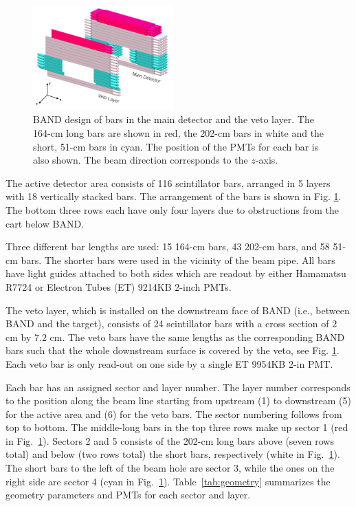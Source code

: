 \documentclass[3p,final,twocolumn]{elsarticle}
\begin{document}
\begin{figure}[tb]
	\centering
			\includegraphics[width=0.48\textwidth]{band-schematic.pdf}
            \caption{BAND design of bars in the main
                   detector and the veto layer. The 164-\si{\centi\meter} long bars are shown in
                          red, the 202-\si{\centi\meter} bars in white
                          and the short, 51-\si{\centi\meter} bars in cyan. The position of
                          the PMTs for each bar is also shown. The beam direction corresponds to the $z$-axis.   }
		\label{fig:design}
\end{figure}

The active detector area consists of 116 scintillator bars, arranged
in 5 layers with 18 vertically stacked bars. The arrangement of the
bars is shown in Fig. \ref{fig:design}. The bottom three rows each have only
four layers due to obstructions from the cart below BAND.

Three different bar lengths are used: 15 164-\si{\centi\meter} bars, 43 202-\si{\centi\meter} bars, and 58 
51-\si{\centi\meter}  bars. The shorter bars were used in the vicinity of
the beam pipe. All bars have light guides attached to both sides which
are readout by either Hamamatsu R7724 \cite{pmtR7724} or Electron
Tubes (ET) 9214KB \cite{pmt9214} 2-inch PMTs.

The veto layer, which is installed on the downstream face of BAND
(i.e., between BAND and the target),
consists of 24 scintillator bars with a cross section of $2$
\si{\centi\meter} by $7.2$ \si{\centi\meter}. The veto bars have the
same lengths as the corresponding BAND bars such that the whole
downstream surface is covered by the veto, see
Fig. \ref{fig:design}. Each veto bar is only read-out on one side by a
single ET 9954KB \cite{pmt9954} 2-in PMT.

Each bar has an assigned sector and layer number. The layer number
corresponds to the position along the beam line starting
from upstream (1) to downstream (5) for the active area and (6) for
the veto bars. The sector numbering follows from top to bottom. The
middle-long bars in the top three rows make up sector 1 (red in
Fig.~\ref{fig:design}). Sectors 2 and 5 consists of the 202-cm long bars above
(seven rows total) and below (two rows total) the short bars,
respectively (white in Fig.~\ref{fig:design}). The short bars to the
left of the beam hole are sector 3, while the ones on the right side
are sector 4 (cyan in Fig.~\ref{fig:design}).
Table~\ref{tab:geometry} summarizes the geometry parameters and PMTs
for each sector and layer.
\end{document}
